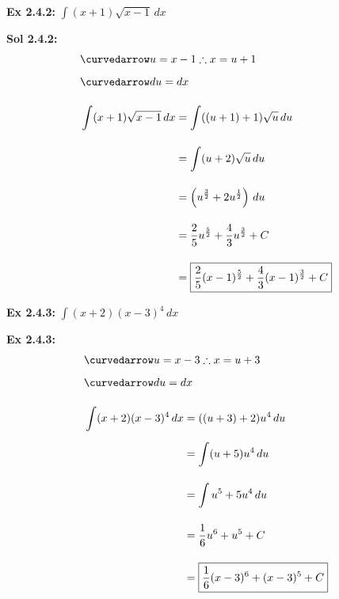 \begin{tcolorbox}[example]
    \textbf{Ex 2.4.2: } $\int (x + 1)\sqrt{x - 1} \, dx$
\end{tcolorbox} 
\begin{tcolorbox}[solution]
    \textbf{Sol 2.4.2: } \begin{align*}
        & \curvedarrow u = x - 1 \therefore x = u + 1 \\[5.5pt]
        & \curvedarrow du = dx \\[11pt]
        & \int (x + 1)\sqrt{x - 1} \, dx \begin{aligned}[t]
            & = \int ((u + 1) + 1)\sqrt{u} \, du \\[11pt]
            & = \int (u + 2)\sqrt{u} \, du \\[11pt]
            & = \left(u^{\frac{3}{2}} + 2u^{\frac{1}{2}}\right) \, du \\[11pt]
            & = \dfrac{2}{5}u^{\frac{5}{2}} + \dfrac{4}{3}u^{\frac{3}{2}} + C \\[11pt]
            & = \boxed{\frac{2}{5}(x - 1)^{\frac{5}{2}} + \dfrac{4}{3}(x - 1)^{\frac{3}{2}} + C}
        \end{aligned}
    \end{align*}
\end{tcolorbox} \vspace{11pt}

\begin{tcolorbox}[example]
    \textbf{Ex 2.4.3: } $\int (x + 2)(x - 3)^4 \, dx$ 
\end{tcolorbox}
\begin{tcolorbox}[solution]
    \textbf{Ex 2.4.3: } \begin{align*}
        & \curvedarrow u = x - 3 \therefore x = u + 3 \\[5.5pt]
        & \curvedarrow du = dx \\[11pt]
        & \int (x + 2)(x - 3)^4 \, dx \begin{aligned}[t]
            & = ((u + 3) + 2)u^4 \, du \\[11pt]
            & = \int (u + 5)u^4 \, du \\[11pt]
            & = \int u^5 + 5u^4 \, du \\[11pt]
            & = \dfrac{1}{6}u^6 + u^5 + C \\[11pt]
            & = \boxed{\dfrac{1}{6}(x - 3)^6 + (x - 3)^5 + C}
        \end{aligned}
    \end{align*}
\end{tcolorbox} \vspace{11pt}

